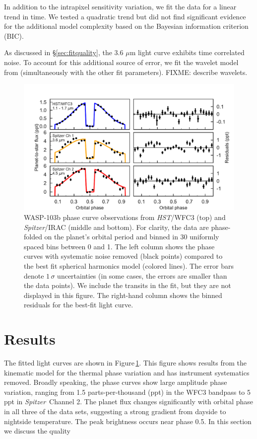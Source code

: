 \documentclass[twocolumn]{aastex61}
\newcommand{\project}[1]{\textsl{#1}}
\newcommand{\HST}{\project{HST}}
\newcommand{\Spitzer}{\project{Spitzer}}
\begin{document}
In addition to the intrapixel sensitivity variation, we fit the data for a linear trend in time. We tested a quadratic trend but did not find significant evidence for the additional model complexity based on the Bayesian information criterion (BIC). 

As discussed in \S \ref{sec:fitquality}, the 3.6 $\mu$m light curve exhibits time correlated noise. To account for this additional source of error, we fit the wavelet model from \cite{carter09} (simultaneously with the other fit parameters). FIXME: describe wavelets.


\begin{figure}
\includegraphics[width = 1.0\textwidth]{Figures/phase_curves_spherical.pdf}
\caption{WASP-103b phase curve observations from \HST/WFC3 (top) and \Spitzer/IRAC (middle and bottom). For clarity, the data are phase-folded on the planet's orbital period and binned in 30 uniformly spaced bins between 0 and 1. The left column shows the phase curves with systematic noise removed (black points) compared to the best fit spherical harmonics model (colored lines). The error bars denote $1\,\sigma$ uncertainties (in some cases, the errors are smaller than the data points).
We include the transits in the fit, but they are not displayed in this figure. The right-hand column shows the binned residuals for the best-fit light curve.}
\label{fig:phasecurves}
\end{figure}

\section{Results}
The fitted light curves are shown in Figure\,\ref{fig:phasecurves}. This figure shows results from the kinematic model for the thermal phase variation and has instrument systematics removed.  Broadly speaking, the phase curves show large amplitude phase variation, ranging from 1.5 parts-per-thousand (ppt) in the WFC3 bandpass to 5 ppt in \Spitzer\ Channel 2.  The planet flux changes significantly with orbital phase in all three of the data sets, suggesting a strong gradient from dayside to nightside temperature. The peak brightness occurs near phase 0.5.
In this section we discuss the quality 
\end{document}
